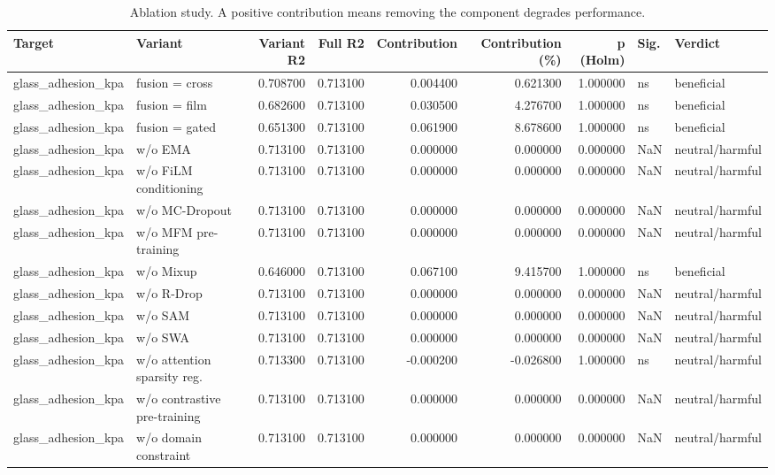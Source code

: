 \begin{table}
\caption{Ablation study. A positive contribution means removing the component degrades performance.}
\label{tab:ablation}
\begin{tabular}{llrrrrrll}
\toprule
Target & Variant & Variant R2 & Full R2 & Contribution & Contribution (\%) & p (Holm) & Sig. & Verdict \\
\midrule
glass\_adhesion\_kpa & fusion = cross & 0.708700 & 0.713100 & 0.004400 & 0.621300 & 1.000000 & ns & beneficial \\
glass\_adhesion\_kpa & fusion = film & 0.682600 & 0.713100 & 0.030500 & 4.276700 & 1.000000 & ns & beneficial \\
glass\_adhesion\_kpa & fusion = gated & 0.651300 & 0.713100 & 0.061900 & 8.678600 & 1.000000 & ns & beneficial \\
glass\_adhesion\_kpa & w/o EMA & 0.713100 & 0.713100 & 0.000000 & 0.000000 & 0.000000 & NaN & neutral/harmful \\
glass\_adhesion\_kpa & w/o FiLM conditioning & 0.713100 & 0.713100 & 0.000000 & 0.000000 & 0.000000 & NaN & neutral/harmful \\
glass\_adhesion\_kpa & w/o MC-Dropout & 0.713100 & 0.713100 & 0.000000 & 0.000000 & 0.000000 & NaN & neutral/harmful \\
glass\_adhesion\_kpa & w/o MFM pre-training & 0.713100 & 0.713100 & 0.000000 & 0.000000 & 0.000000 & NaN & neutral/harmful \\
glass\_adhesion\_kpa & w/o Mixup & 0.646000 & 0.713100 & 0.067100 & 9.415700 & 1.000000 & ns & beneficial \\
glass\_adhesion\_kpa & w/o R-Drop & 0.713100 & 0.713100 & 0.000000 & 0.000000 & 0.000000 & NaN & neutral/harmful \\
glass\_adhesion\_kpa & w/o SAM & 0.713100 & 0.713100 & 0.000000 & 0.000000 & 0.000000 & NaN & neutral/harmful \\
glass\_adhesion\_kpa & w/o SWA & 0.713100 & 0.713100 & 0.000000 & 0.000000 & 0.000000 & NaN & neutral/harmful \\
glass\_adhesion\_kpa & w/o attention sparsity reg. & 0.713300 & 0.713100 & -0.000200 & -0.026800 & 1.000000 & ns & neutral/harmful \\
glass\_adhesion\_kpa & w/o contrastive pre-training & 0.713100 & 0.713100 & 0.000000 & 0.000000 & 0.000000 & NaN & neutral/harmful \\
glass\_adhesion\_kpa & w/o domain constraint & 0.713100 & 0.713100 & 0.000000 & 0.000000 & 0.000000 & NaN & neutral/harmful \\

\end{tabular}
\end{table}
